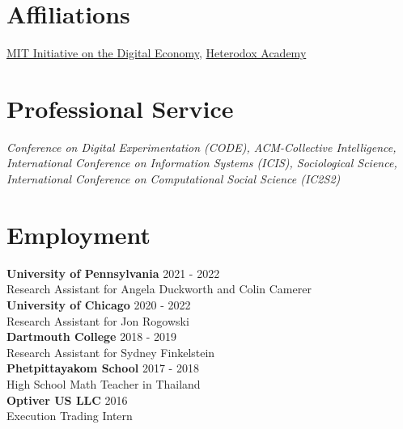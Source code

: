 \documentclass[margin,line,pifont,palatino,courier, 9pt]{res}
\begin{document}
\begin{resume}
\section{\sc Affiliations}
\href{https://ide.mit.edu/}{MIT Initiative on the Digital Economy}, \href{https://heterodoxacademy.org/}{Heterodox Academy}

\section{\sc Professional Service}
\textit{Conference on Digital Experimentation (CODE), ACM-Collective Intelligence, International Conference on Information Systems (ICIS), Sociological Science, International Conference on Computational Social Science (IC2S2)}

\section{\sc Employment}
\textbf{University of Pennsylvania} \hfill 2021 - 2022 \\
Research Assistant for Angela Duckworth and Colin Camerer \vspace{2mm}\\
\textbf{University of Chicago} \hfill 2020 - 2022\\
Research Assistant for Jon Rogowski \vspace{2mm}\\
\textbf{Dartmouth College} \hfill 2018 - 2019 \\
Research Assistant for Sydney Finkelstein \vspace{2mm}\\
\textbf{Phetpittayakom School} \hfill 2017 - 2018 \\
High School Math Teacher in Thailand \vspace{2mm}\\
\textbf{Optiver US LLC} \hfill 2016 \\
Execution Trading Intern

\end{resume}
\end{document}
